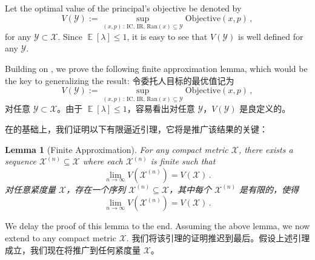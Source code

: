 \documentclass[12pt,letterpaper]{article}
\newenvironment{original}{\color{black}\noindent}{}
\newenvironment{translation}{\color{blue}\noindent}{}
\theoremstyle{plain}
\newtheorem{lemma}{Lemma}
\theoremstyle{definition}
\theoremstyle{remark}
\DeclareMathOperator{\E}{\mathds{E}}
\newcommand{\Y}{\mathcal{Y}}
\renewcommand{\1}{\mathds{1}}
\newcommand{\X}{\mathcal{X}}
\theoremstyle{definition}
\begin{document}
\begin{original}
Let the optimal value of the principal's objective be denoted by
\[V(\Y):= \sup_{(x, p)\,:\,\text{IC, IR, Ran}(x) \subseteq \Y} \text{Objective}(x, p)\,,\]
for any $\Y \subset \X$. Since $\E[\lambda] \leq 1$, it is easy to see that $V(\Y)$ is well defined for any $\Y$.

Building on \citet{madarasz2017sellers}, we prove the following finite approximation lemma, which would be the key to generalizing the result:
\end{original}
\begin{translation}
令委托人目标的最优值记为
\[V(\Y):= \sup_{(x, p)\,:\,\text{IC, IR, Ran}(x) \subseteq \Y} \text{Objective}(x, p)\,,\]
对任意 $\Y \subset \X$。由于 $\E[\lambda] \leq 1$，容易看出对任意 $\Y$，$V(\Y)$ 是良定义的。

在\citet{madarasz2017sellers}的基础上，我们证明以下有限逼近引理，它将是推广该结果的关键：
\end{translation}

\begin{lemma}[Finite Approximation]\label{lem:finite}
\begin{original}
For any compact metric $\X$, there exists a sequence $\X^{(n)} \subseteq \X$ where each $\X^{(n)}$ is finite such that
\[\lim_{n\rightarrow \infty}V(\X^{(n)}) = V(\X)\,.\]
\end{original}
\begin{translation}
对任意紧度量 $\X$，存在一个序列 $\X^{(n)} \subseteq \X$，其中每个 $\X^{(n)}$ 是有限的，使得
\[\lim_{n\rightarrow \infty}V(\X^{(n)}) = V(\X)\,.\]
\end{translation}
\end{lemma}

\begin{original}
We delay the proof of this lemma to the end. Assuming the above lemma, we now extend  to any compact metric $\X$.
\end{original}
\begin{translation}
我们将该引理的证明推迟到最后。假设上述引理成立，我们现在将推广到任何紧度量 $\X$。
\end{translation}
\end{document}
